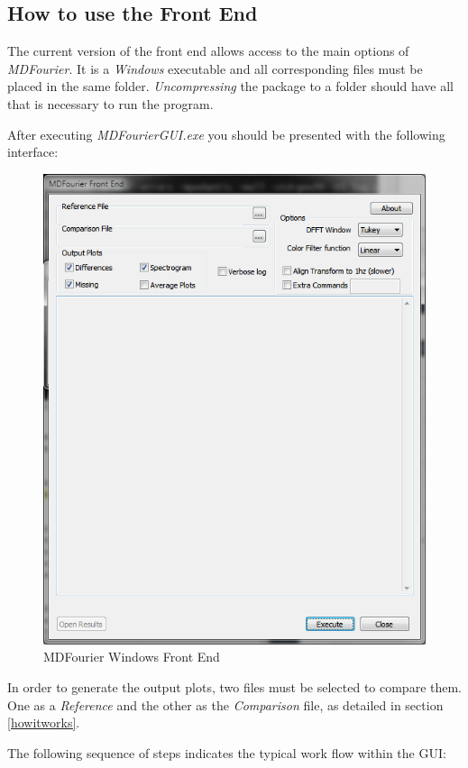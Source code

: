 \documentclass[10pt,a4paper]{report}
\begin{document}
\begin{appendices}
	
\chapter{How to use the Front End}
\label{usinggui}
The current version of the front end allows access to the main options of \textit{MDFourier}. It is a \textit{Windows} executable and all corresponding files must be placed in the same folder. \textit{Uncompressing} the package to a folder should have all that is necessary to run the program.

After executing \textit{MDFourierGUI.exe} you should be presented with the following interface:

\begin{figure}[H]
	\centering
	\includegraphics[width=0.6\linewidth]{images/GUI/GUI1.png}
	\caption[Front End]{MDFourier Windows Front End}
	\label{fig:gui1}
\end{figure}

In order to generate the output plots, two files must be selected to compare them. One as a \textit{Reference} and the other as the \textit{Comparison} file, as detailed in section \ref{howitworks}.

The following sequence of steps indicates the typical work flow within the GUI:


\end{appendices}
\end{document}
